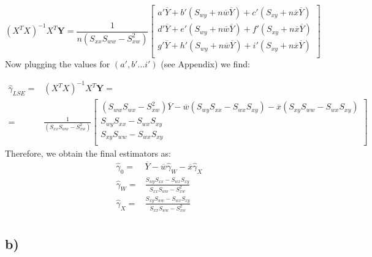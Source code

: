 \documentclass[a4paper]{article}
\begin{document}
\begin{equation*}
(X^{T}X)^{-1}X^{T}\textbf{Y} = 
	\frac{1}{n(S_{xx}S_{ww}-S_{xw}^2)}
	\begin{bmatrix}
	a'\overline{Y} + b'(S_{wy} + n\overline{w}\overline{Y}) + c'(S_{xy} + n\overline{x}\overline{Y}) \\
	d'\overline{Y} + e'(S_{wy} + n\overline{w}\overline{Y}) + f'(S_{xy} + n\overline{x}\overline{Y}) \\
	g'\overline{Y} + h'(S_{wy} + n\overline{w}\overline{Y}) + i'(S_{xy} + n\overline{x}\overline{Y}) \\
	\end{bmatrix} 
\end{equation*}
Now plugging the values for $(a', b' ... i')$ (see Appendix) we find:

\begin{equation*}
\begin{split}
\hat{\gamma}_{LSE} = & (X^{T}X)^{-1}X^{T}\textbf{Y} = \\
	= & \frac{1}{(S_{xx}S_{ww}-S_{xw}^2)}
	\begin{bmatrix}
	(S_{ww}S_{wx}-S_{xw}^2)\overline{Y} - \overline{w}(S_{wy}S_{xx} - S_{wx}S_{xy}) - \overline{x}(S_{xy}S_{ww} - S_{wx}S_{xy}) \\
	S_{wy}S_{xx} - S_{wx}S_{xy} \\
	S_{xy}S_{ww} - S_{wx}S_{xy} \\
	\end{bmatrix} 
\end{split}
\end{equation*}
Therefore, we obtain the final estimators as:
\begin{equation*}
\begin{split}
	\hat{\gamma}_{0} = & \overline{Y} - \overline{w}\hat{\gamma}_{W} - \overline{x}\hat{\gamma}_{X} \\
	\hat{\gamma}_{W} = & \frac{S_{wy}S_{xx} - S_{wx}S_{xy}}{S_{xx}S_{ww}-S_{xw}^2} \\
	\hat{\gamma}_{X} = & \frac{S_{xy}S_{ww} - S_{wx}S_{xy}}{S_{xx}S_{ww}-S_{xw}^2} \\
\end{split}
\end{equation*}

\subsection*{b)}
\end{document}
